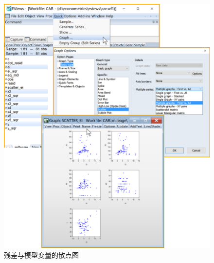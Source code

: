 \documentclass[12pt,(landscape,a4paper),(portrait,a4paper)]{article}
\begin{document}
\begin{figure}

{\centering \includegraphics[width=28.14in]{picture/lab6-heteroskedasticity/3-scatter-ei} 

}

\caption{残差与模型变量的散点图}\label{fig:fig-scatter-ei}
\end{figure}
\end{document}
